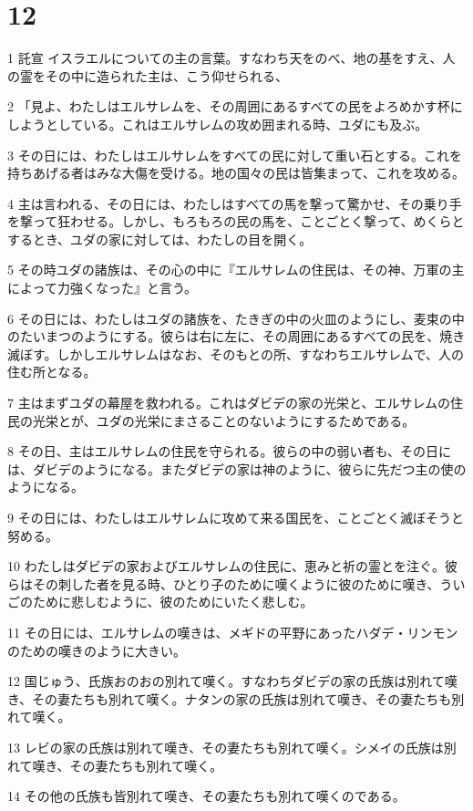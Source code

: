 \chapter{12}

\par 1 託宣 イスラエルについての主の言葉。すなわち天をのべ、地の基をすえ、人の霊をその中に造られた主は、こう仰せられる、
\par 2 「見よ、わたしはエルサレムを、その周囲にあるすべての民をよろめかす杯にしようとしている。これはエルサレムの攻め囲まれる時、ユダにも及ぶ。
\par 3 その日には、わたしはエルサレムをすべての民に対して重い石とする。これを持ちあげる者はみな大傷を受ける。地の国々の民は皆集まって、これを攻める。
\par 4 主は言われる、その日には、わたしはすべての馬を撃って驚かせ、その乗り手を撃って狂わせる。しかし、もろもろの民の馬を、ことごとく撃って、めくらとするとき、ユダの家に対しては、わたしの目を開く。
\par 5 その時ユダの諸族は、その心の中に『エルサレムの住民は、その神、万軍の主によって力強くなった』と言う。
\par 6 その日には、わたしはユダの諸族を、たきぎの中の火皿のようにし、麦束の中のたいまつのようにする。彼らは右に左に、その周囲にあるすべての民を、焼き滅ぼす。しかしエルサレムはなお、そのもとの所、すなわちエルサレムで、人の住む所となる。
\par 7 主はまずユダの幕屋を救われる。これはダビデの家の光栄と、エルサレムの住民の光栄とが、ユダの光栄にまさることのないようにするためである。
\par 8 その日、主はエルサレムの住民を守られる。彼らの中の弱い者も、その日には、ダビデのようになる。またダビデの家は神のように、彼らに先だつ主の使のようになる。
\par 9 その日には、わたしはエルサレムに攻めて来る国民を、ことごとく滅ぼそうと努める。
\par 10 わたしはダビデの家およびエルサレムの住民に、恵みと祈の霊とを注ぐ。彼らはその刺した者を見る時、ひとり子のために嘆くように彼のために嘆き、ういごのために悲しむように、彼のためにいたく悲しむ。
\par 11 その日には、エルサレムの嘆きは、メギドの平野にあったハダデ・リンモンのための嘆きのように大きい。
\par 12 国じゅう、氏族おのおの別れて嘆く。すなわちダビデの家の氏族は別れて嘆き、その妻たちも別れて嘆く。ナタンの家の氏族は別れて嘆き、その妻たちも別れて嘆く。
\par 13 レビの家の氏族は別れて嘆き、その妻たちも別れて嘆く。シメイの氏族は別れて嘆き、その妻たちも別れて嘆く。
\par 14 その他の氏族も皆別れて嘆き、その妻たちも別れて嘆くのである。

